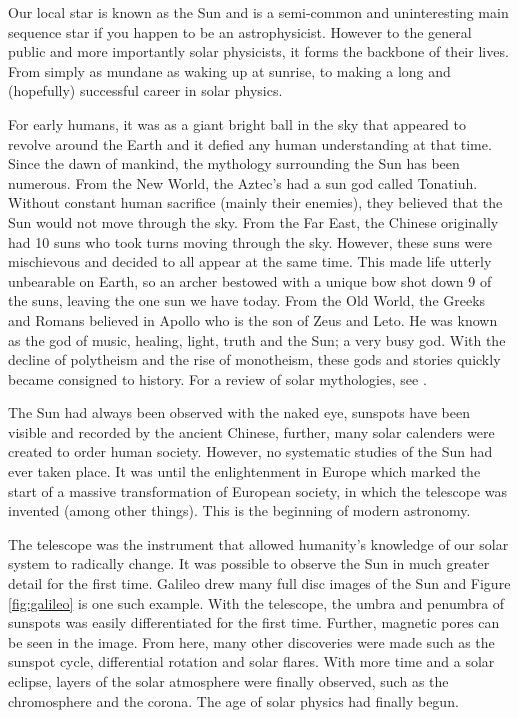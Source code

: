     Our local star is known as the Sun and is a semi-common and uninteresting main sequence star if you happen to be an astrophysicist.
    However to the general public and more importantly solar physicists, it forms the backbone of their lives.
    From simply as mundane as waking up at sunrise, to making a long and (hopefully) successful career in solar physics.
    
    For early humans, it was as a giant bright ball in the sky that appeared to revolve around the Earth and it defied any human understanding at that time.
    Since the dawn of mankind, the mythology surrounding the Sun has been numerous.    
    From the New World, the Aztec's had a sun god called Tonatiuh. 
    Without constant human sacrifice (mainly their enemies), they believed that the Sun would not move through the sky.
    From the Far East, the Chinese originally had 10 suns who took turns moving through the sky. 
    However, these suns were mischievous and decided to all appear at the same time. 
    This made life utterly unbearable on Earth, so an archer bestowed with a unique bow shot down 9 of the suns, leaving the one sun we have today.
    From the Old World, the Greeks and Romans believed in Apollo who is the son of Zeus and Leto.
    He was known as the god of music, healing, light, truth and the Sun; a very busy god.
    With the decline of polytheism and the rise of monotheism, these gods and stories quickly became consigned to history. 
    For a review of solar mythologies, see \citet{mythbook}.
    
    The Sun had always been observed with the naked eye, sunspots have been visible and recorded by the ancient Chinese, further, many solar calenders were created to order human society.
    However, no systematic studies of the Sun had ever taken place.
    It was until the enlightenment in Europe which marked the start of a massive transformation of European society, in which the telescope was invented (among other things).
    This is the beginning of modern astronomy.
    
    The telescope was the instrument that allowed humanity's knowledge of our solar system to radically change.
    It was possible to observe the Sun in much greater detail for the first time.
    Galileo drew many full disc images of the Sun and Figure \ref{fig:galileo} is one such example. 
    With the telescope, the umbra and penumbra of sunspots was easily differentiated for the first time.
    Further, magnetic pores can be seen in the image.
    From here, many other discoveries were made such as the sunspot cycle, differential rotation and solar flares.
    With more time and a solar eclipse, layers of the solar atmosphere were finally observed, such as the chromosphere and the corona.
    The age of solar physics had finally begun.
    
